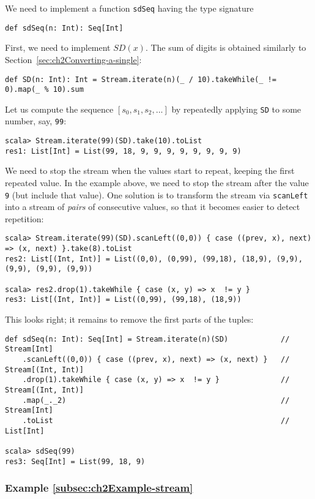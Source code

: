 We need to implement a function \lstinline!sdSeq! having the type
signature
\begin{lstlisting}
def sdSeq(n: Int): Seq[Int]
\end{lstlisting}
First, we need to implement $SD(x)$. The sum of digits is obtained
similarly to Section~\ref{sec:ch2Converting-a-single}:
\begin{lstlisting}
def SD(n: Int): Int = Stream.iterate(n)(_ / 10).takeWhile(_ != 0).map(_ % 10).sum
\end{lstlisting}
Let us compute the sequence $\left[s_{0},s_{1},s_{2},...\right]$
by repeatedly applying \lstinline!SD! to some number, say, \lstinline!99!:
\begin{lstlisting}
scala> Stream.iterate(99)(SD).take(10).toList
res1: List[Int] = List(99, 18, 9, 9, 9, 9, 9, 9, 9, 9)
\end{lstlisting}
We need to stop the stream when the values start to repeat, keeping
the first repeated value. In the example above, we need to stop the
stream after the value \lstinline!9! (but include that value). One
solution is to transform the stream via \lstinline!scanLeft! into
a stream of \emph{pairs} of consecutive values, so that it becomes
easier to detect repetition:
\begin{lstlisting}
scala> Stream.iterate(99)(SD).scanLeft((0,0)) { case ((prev, x), next) => (x, next) }.take(8).toList
res2: List[(Int, Int)] = List((0,0), (0,99), (99,18), (18,9), (9,9), (9,9), (9,9), (9,9))

scala> res2.drop(1).takeWhile { case (x, y) => x  != y }
res3: List[(Int, Int)] = List((0,99), (99,18), (18,9))
\end{lstlisting}
This looks right; it remains to remove the first parts of the tuples:
\begin{lstlisting}
def sdSeq(n: Int): Seq[Int] = Stream.iterate(n)(SD)            // Stream[Int]
    .scanLeft((0,0)) { case ((prev, x), next) => (x, next) }   // Stream[(Int, Int)]
    .drop(1).takeWhile { case (x, y) => x  != y }              // Stream[(Int, Int)]
    .map(_._2)                                                 // Stream[Int]
    .toList                                                    // List[Int]

scala> sdSeq(99)
res3: Seq[Int] = List(99, 18, 9)
\end{lstlisting}


\subsubsection{Example \label{subsec:ch2Example-stream}\ref{subsec:ch2Example-stream}}

